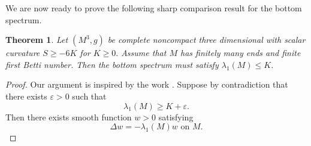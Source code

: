\documentclass[10pt,a4paper]{amsart}
\newtheorem{theorem}{Theorem}[section]
\numberwithin{equation}{section}
\begin{document}
We are now ready to prove the following sharp comparison result for the bottom spectrum. 

\begin{theorem}
Let $\left( M^{3},g\right) $ be complete noncompact three dimensional with
scalar curvature $S\geq -6K$ for $K\geq 0.$ Assume that $M$ has finitely
many ends and finite first Betti number. Then the bottom spectrum must satisfy
$\lambda _{1}\left( M\right)\leq K.$
\end{theorem}

\begin{proof}
Our argument is inspired by the work \cite{APX, HKKZ}.
Suppose by contradiction that there exists $\varepsilon >0$ such that 
\begin{equation}
\lambda _{1}\left( M\right) \geq K+\varepsilon.  \label{a0}
\end{equation}
Then there exists smooth function $w>0$ satisfying
\begin{equation}
\Delta w=-\lambda _{1}\left( M\right) w\text{ \ on \ }M.  \label{w}
\end{equation}


\end{proof}
\end{document}

